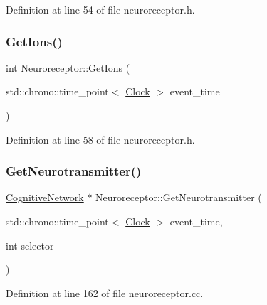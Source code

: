 Definition at line 54 of file neuroreceptor.\+h.

\mbox{\label{class_neuroreceptor_a69103180d9b335b9504b4ae3c203d0ea}} 
\subsubsection{\texorpdfstring{Get\+Ions()}{GetIons()}}
{\footnotesize\ttfamily int Neuroreceptor\+::\+Get\+Ions (\begin{DoxyParamCaption}\item[{std\+::chrono\+::time\+\_\+point$<$ \hyperlink{universe_8h_a0ef8d951d1ca5ab3cfaf7ab4c7a6fd80}{Clock} $>$}]{event\+\_\+time }\end{DoxyParamCaption})\hspace{0.3cm}{\ttfamily [inline]}}



Definition at line 58 of file neuroreceptor.\+h.

\mbox{\label{class_neuroreceptor_a526d41738265399c19c67068db450851}} 
\subsubsection{\texorpdfstring{Get\+Neurotransmitter()}{GetNeurotransmitter()}}
{\footnotesize\ttfamily \hyperlink{class_cognitive_network}{Cognitive\+Network} $\ast$ Neuroreceptor\+::\+Get\+Neurotransmitter (\begin{DoxyParamCaption}\item[{std\+::chrono\+::time\+\_\+point$<$ \hyperlink{universe_8h_a0ef8d951d1ca5ab3cfaf7ab4c7a6fd80}{Clock} $>$}]{event\+\_\+time,  }\item[{int}]{selector }\end{DoxyParamCaption})}



Definition at line 162 of file neuroreceptor.\+cc.

